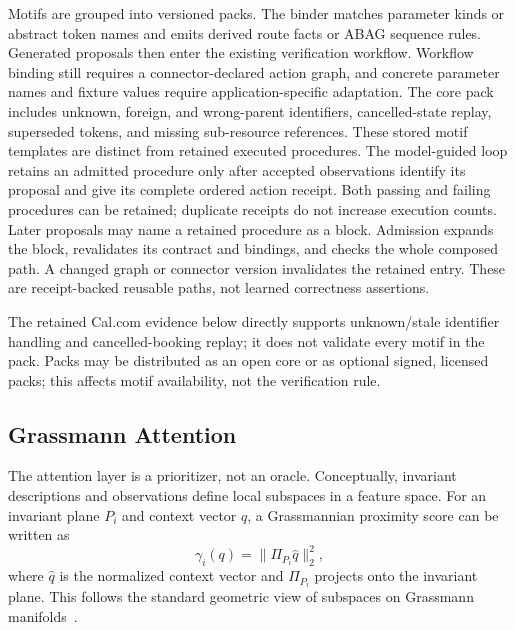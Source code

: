 \documentclass[10pt]{article}
\begin{document}
Motifs are grouped into versioned packs. The binder matches parameter kinds or
abstract token names and emits derived route facts or ABAG sequence rules.
Generated proposals then enter the existing verification workflow. Workflow
binding still requires a connector-declared action graph, and concrete
parameter names and fixture values require application-specific adaptation.
The core pack includes unknown, foreign, and wrong-parent identifiers,
cancelled-state replay, superseded tokens, and missing sub-resource references.
These stored motif templates are distinct from retained executed procedures.
The model-guided loop retains an admitted procedure only after accepted
observations identify its proposal and give its complete ordered action receipt.
Both passing and failing procedures can be retained; duplicate receipts do not
increase execution counts. Later proposals may name a retained procedure as a
block. Admission expands the block, revalidates its contract and bindings, and
checks the whole composed path. A changed graph or connector version invalidates
the retained entry. These are receipt-backed reusable paths, not learned
correctness assertions.

The retained Cal.com evidence below directly supports unknown/stale identifier
handling and cancelled-booking replay; it does not validate every motif in the
pack. Packs may be distributed as an open core or as optional signed, licensed
packs; this affects motif availability, not the verification rule.

\subsection{Grassmann Attention}

The attention layer is a prioritizer, not an oracle. Conceptually, invariant
descriptions and observations define local subspaces in a feature space. For an
invariant plane \(P_i\) and context vector \(q\), a Grassmannian proximity score
can be written as
\[
  \gamma_i(q) = \|\Pi_{P_i} \widehat q\|_2^2,
\]
where \(\widehat q\) is the normalized context vector and
\(\Pi_{P_i}\) projects onto the invariant plane. This follows the
standard geometric view of subspaces on Grassmann manifolds~\cite{edelman1998geometry}.
\end{document}
